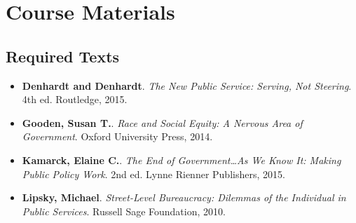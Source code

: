\documentclass[12pt, letterpaper]{article}
\begin{document}
\section{Course Materials}
\subsection*{Required Texts}
\begin{itemize}
    \item \textbf{Denhardt and Denhardt}. \textit{The New Public Service: Serving, Not Steering}. 4th ed. Routledge, 2015.
    \item \textbf{Gooden, Susan T.}. \textit{Race and Social Equity: A Nervous Area of Government}. Oxford University Press, 2014.
    \item \textbf{Kamarck, Elaine C.}. \textit{The End of Government…As We Know It: Making Public Policy Work}. 2nd ed. Lynne Rienner Publishers, 2015.
    \item \textbf{Lipsky, Michael}. \textit{Street-Level Bureaucracy: Dilemmas of the Individual in Public Services}. Russell Sage Foundation, 2010.
\end{itemize}
\end{document}
